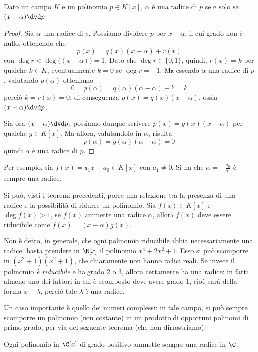 \begin{teorema}[di Ruffini] \label{t:ruffini}
	Dato un campo $K$ e un polinomio $p\in K[x]$, $\alpha$ è una radice di $p$ se e solo se $(x-\alpha)\dvd p$.
\end{teorema}
\begin{proof}
	Sia $\alpha$ una radice di $p$.
	Possiamo dividere $p$ per $x-\alpha$, il cui grado non è nullo, ottenendo che
	\begin{equation*}
		p(x)=q(x)(x-\alpha)+r(x)
	\end{equation*}
	con $\deg r<\deg\big( (x-\alpha)\big)=1$.
	Dato che $\deg r\in\{0,1\}$, quindi, $r(x)=k$ per qualche $k\in K$, eventualmente $k=0$ se $\deg r=-1$.
	Ma essendo $\alpha$ una radice di $p$, valutando $p(\alpha)$ otteniamo
	\begin{equation*}
		0=p(\alpha)=q(\alpha)(\alpha-\alpha)+k=k
	\end{equation*}
	perciò $k=r(x)=0$: di conseguenza $p(x)=q(x)(x-\alpha)$, ossia $(x-\alpha)\dvd p$.
	
	Sia ora $(x-\alpha)\dvd p$: possiamo dunque scrivere $p(x)=g(x)(x-\alpha)$ per qualche $g\in K[x]$.
	Ma allora, valutandolo in $\alpha$, risulta
	\begin{equation*}
		p(\alpha)=g(\alpha)(\alpha-\alpha)=0
	\end{equation*}
	quindi $\alpha$ è una radice di $p$.
\end{proof}
Per esempio, sia $f(x) = a_1 x + a_0 \in K[x]$ con $a_1 \neq 0$.
Si ha che $\alpha = - \frac{a_0}{a_1}$ è sempre una radice.

Si può, visti i teoremi precedenti, porre una relazione tra la presenza di una radice e la possibilità di ridurre un polinomio. Sia $f(x)\in K[x]$ e $\deg f(x) > 1$, se $f(x)$ ammette una radice $\alpha$, allora $f(x)$ deve essere riducibile come $f(x) = (x-\alpha) g(x)$.

Non è detto, in generale, che ogni polinomio riducibile abbia necessariamente una radice: basta prendere in $\R[x]$ il polinomio $x^4+2x^2+1$.
Esso si può scomporre in $(x^2+1)(x^2+1)$, che chiaramente non hanno radici reali.
Se invece il polinomio \emph{è riducibile} e ha grado 2 o 3, allora certamente ha una radice: in fatti almeno uno dei fattori in cui è scomposto deve avere grado 1, cioè sarà della forma $x-\lambda$, perciò tale $\lambda$ è una radice.

Un caso importante è quello dei numeri complessi: in tale campo, si può sempre scomporre un polinomio (non costante) in un prodotto di opportuni polinomi di primo grado, per via del seguente teorema (che non dimostriamo).
\begin{teorema} \label{t:fondamentale-algebra}
	Ogni polinomio in $\C[x]$ di grado positivo ammette sempre una radice in $\C$.
\end{teorema}

